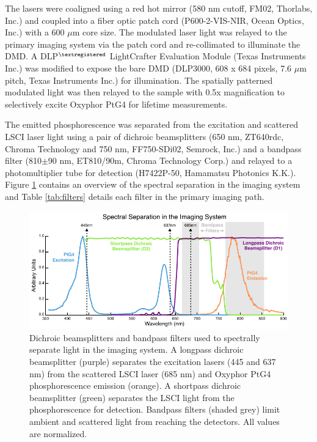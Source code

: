 The lasers were coaligned using a red hot mirror (580 nm cutoff, FM02, Thorlabs, Inc.) and coupled into a fiber optic patch cord (P600-2-VIS-NIR, Ocean Optics, Inc.) with a 600 $\mu$m core size. The modulated laser light was relayed to the primary imaging system via the patch cord and re-collimated to illuminate the DMD. A DLP$^{\tiny{\textregistered}}$ LightCrafter Evaluation Module (Texas Instruments Inc.) was modified to expose the bare DMD (DLP3000, 608 x 684 pixels, 7.6 $\mu$m pitch, Texas Instruments Inc.) for illumination. The spatially patterned modulated light was then relayed to the sample with 0.5x magnification to selectively excite Oxyphor PtG4 for lifetime measurements.

The emitted phosphorescence was separated from the excitation and scattered LSCI laser light using a pair of dichroic beamsplitters (650 nm, ZT640rdc, Chroma Technology and 750 nm, FF750-SDi02, Semrock, Inc.) and a bandpass filter (810$\pm$90 nm, ET810/90m, Chroma Technology Corp.) and relayed to a photomultiplier tube for detection (H7422P-50, Hamamatsu Photonics K.K.). Figure \ref{fig:systemspectra} contains an overview of the spectral separation in the imaging system and Table \ref{tab:filters} details each filter in the primary imaging path.

\begin{figure}
    \includegraphics{figures/chapter_2/systemspectra.pdf}
    \caption{
        \label{fig:systemspectra}
        Dichroic beamsplitters and bandpass filters used to spectrally separate light in the imaging system. A longpass dichroic beamsplitter (purple) separates the excitation lasers (445 and 637 nm) from the scattered LSCI laser (685 nm) and Oxyphor PtG4 phosphorescence emission (orange). A shortpass dichroic beamsplitter (green) separates the LSCI light from the phosphorescence for detection. Bandpass filters (shaded grey) limit ambient and scattered light from reaching the detectors. All values are normalized.
    }
\end{figure}

